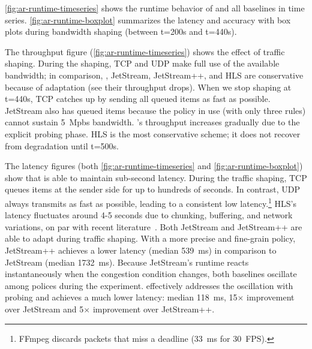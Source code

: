  \autoref{fig:ar-runtime-timeseries} shows the runtime behavior
of \sysname{} and all baselines in time series. \autoref{fig:ar-runtime-boxplot}
summarizes the latency and accuracy with box plots during bandwidth shaping
(between t=200s and t=440s).

The throughput figure (\autoref{fig:ar-runtime-timeseries}) shows the effect of
traffic shaping. During the shaping, TCP and UDP make full use of the available
bandwidth; in comparison, \sysname{}, JetStream, JetStream++, and HLS are
conservative because of adaptation (see their throughput drops). When we stop
shaping at t=440s, TCP catches up by sending all queued items as fast as
possible. JetStream also has queued items because the policy in use (with only
three rules) cannot sustain \SI{5}{Mpbs} bandwidth. \sysname{}'s throughput
increases gradually due to the explicit probing phase. HLS is the most
conservative scheme; it does not recover from degradation until t=500s.


The latency figures (both \autoref{fig:ar-runtime-timeseries} and
\autoref{fig:ar-runtime-boxplot}) show that \sysname{} is able to maintain
sub-second latency. During the traffic shaping, TCP queues items at the sender
side for up to hundreds of seconds. In contrast, UDP always transmits as fast as
possible, leading to a consistent low latency.\footnote{FFmpeg discards packets
  that miss a deadline (\SI{33}{\ms} for \SI{30}{FPS}).} HLS's latency
fluctuates around 4-5 seconds due to chunking, buffering, and network
variations, on par with recent literature~\cite{wang2016anatomy}. Both JetStream
and JetStream++ are able to adapt during traffic shaping. With a more precise
and fine-grain policy, JetStream++ achieves a lower latency (median
\SI{539}{\ms}) in comparison to JetStream (median \SI{1732}{\ms}). Because
JetStream's runtime reacts instantaneously when the congestion condition
changes, both baselines oscillate among polices during the
experiment. \sysname{} effectively addresses the oscillation with probing and
achieves a much lower latency: median \SI{118}{\ms}, 15$\times$ improvement over
JetStream and 5$\times$ improvement over JetStream++.

